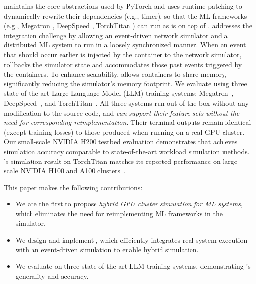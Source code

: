\sys maintains the core abstractions used by PyTorch and uses runtime patching to dynamically rewrite their dependencies (e.g., timer), so that the ML frameworks (e.g., Megatron \cite{shoeybi2019megatron}, DeepSpeed \cite{rasley2020deepspeed}, TorchTitan \cite{liang2025torchtitan}) can run as is on top of \sys.
\sys addresses the integration challenge by allowing an event-driven network simulator and a distributed ML system to run in a loosely synchronized manner. 
When an event that should occur earlier is injected by the container to the network simulator, \sys rollbacks the simulator state and accommodates those past events triggered by the containers. 
To enhance scalability, \sys allows containers to share memory, significantly reducing the simulator's memory footprint.
We evaluate \sys using three state-of-the-art Large Language Model (LLM) training systems: Megatron~\cite{shoeybi2019megatron}, DeepSpeed~\cite{rasley2020deepspeed}, and TorchTitan~\cite{liang2025torchtitan}. 
All three systems run out-of-the-box without any modification to the source code, and \emph{\sys can support their feature sets without the need for corresponding reimplementation.}
Their terminal outputs remain identical (except training losses) to those produced when running on a real GPU cluster.
Our small-scale NVIDIA H200 testbed evaluation demonstrates that \sys achieves simulation accuracy comparable to state-of-the-art workload simulation methods. \sys's simulation result on TorchTitan matches its reported performance on large-scale NVIDIA H100 and A100 clusters~\cite{liang2025torchtitan,torchtitana100}.


This paper makes the following contributions:
\begin{itemize}
\item We are the first to propose \textit{hybrid GPU cluster simulation for ML systems}, which eliminates the need for reimplementing ML frameworks in the simulator.

\item We design and implement \sys, which efficiently integrates real system execution with an event-driven simulation to enable hybrid simulation.

\item We evaluate \sys on three state-of-the-art LLM training systems, demonstrating \sys's generality and accuracy.
\end{itemize}